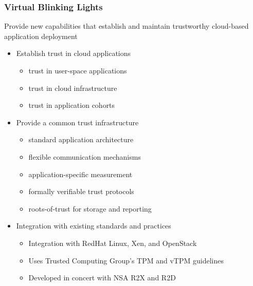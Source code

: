 \documentclass{beamer}
\begin{document}
\begin{frame}
  \frametitle{Virtual Blinking Lights}
  Provide new capabilities that establish and maintain trustworthy
  cloud-based application deployment

  \begin{itemize}
  \item Establish trust in cloud applications
    \begin{itemize}
    \item trust in user-space applications 
    \item trust in cloud infrastructure
    \item trust in application cohorts
    \end{itemize}
  \item Provide a common trust infrastructure
    \begin{itemize}
    \item standard application architecture
    \item flexible communication mechanisms
    \item application-specific measurement
    \item formally verifiable trust protocols
    \item roots-of-trust for storage and reporting
    \end{itemize}
  \item Integration with existing standards and practices
    \begin{itemize}
    \item Integration with RedHat Linux, Xen, and OpenStack
    \item Uses Trusted Computing Group's TPM and vTPM guidelines
    \item Developed in concert with NSA R2X and R2D
    \end{itemize}
  \end{itemize}
\end{frame}
\end{document}
